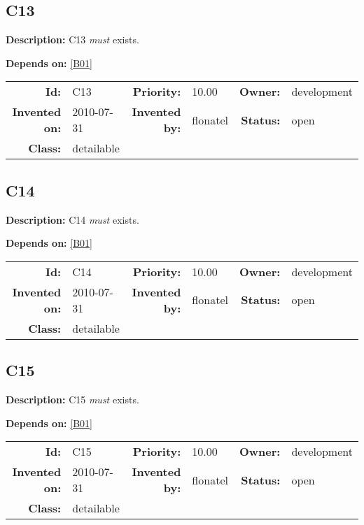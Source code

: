 \subsection{C13}\label{C13}
\textbf{Description:} C13 \textsl{must} exists.

\textbf{Depends on:} \ref{B01} 

\par
{\small \begin{center}\begin{tabular}{rlrlrl}
\textbf{Id:} & C13  & \textbf{Priority:} & 10.00  & \textbf{Owner:} & development\\ 
\textbf{Invented on:} & 2010-07-31  & \textbf{Invented by:} & flonatel  & \textbf{Status:} & open \\ 
\textbf{Class:} & detailable  & & & \end{tabular}\end{center} }
\subsection{C14}\label{C14}
\textbf{Description:} C14 \textsl{must} exists.

\textbf{Depends on:} \ref{B01} 

\par
{\small \begin{center}\begin{tabular}{rlrlrl}
\textbf{Id:} & C14  & \textbf{Priority:} & 10.00  & \textbf{Owner:} & development\\ 
\textbf{Invented on:} & 2010-07-31  & \textbf{Invented by:} & flonatel  & \textbf{Status:} & open \\ 
\textbf{Class:} & detailable  & & & \end{tabular}\end{center} }
\subsection{C15}\label{C15}
\textbf{Description:} C15 \textsl{must} exists.

\textbf{Depends on:} \ref{B01} 

\par
{\small \begin{center}\begin{tabular}{rlrlrl}
\textbf{Id:} & C15  & \textbf{Priority:} & 10.00  & \textbf{Owner:} & development\\ 
\textbf{Invented on:} & 2010-07-31  & \textbf{Invented by:} & flonatel  & \textbf{Status:} & open \\ 
\textbf{Class:} & detailable  & & & \end{tabular}\end{center} }
